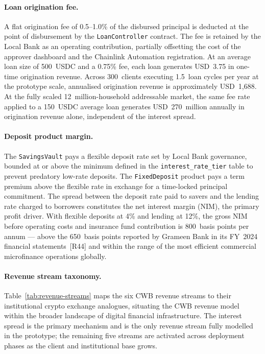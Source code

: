 \paragraph{Loan origination fee.}
A flat origination fee of 0.5--1.0\% of the disbursed principal is deducted
at the point of disbursement by the \texttt{LoanController} contract. The fee
is retained by the Local Bank as an operating contribution, partially
offsetting the cost of the approver dashboard and the Chainlink Automation
registration. At an average loan size of 500~USDC and a 0.75\% fee, each
loan generates USD~3.75 in one-time origination revenue. Across 300~clients
executing 1.5~loan cycles per year at the prototype scale, annualised
origination revenue is approximately USD~1{,}688. At the fully scaled
12~million-household addressable market, the same fee rate applied to a
150~USDC average loan generates USD~270~million annually in origination
revenue alone, independent of the interest spread.

\paragraph{Deposit product margin.}
The \texttt{SavingsVault} pays a flexible deposit rate set by Local Bank
governance, bounded at or above the minimum defined in the
\texttt{interest\_rate\_tier} table to prevent predatory low-rate deposits.
The \texttt{FixedDeposit} product pays a term premium above the flexible
rate in exchange for a time-locked principal commitment. The spread between
the deposit rate paid to savers and the lending rate charged to borrowers
constitutes the net interest margin (NIM), the primary profit driver. With
flexible deposits at 4\% and lending at 12\%, the gross NIM before operating
costs and insurance fund contribution is 800~basis points per annum --- above
the 650~basis points reported by Grameen Bank in its FY~2024 financial
statements~[R44] and within the range of the most efficient commercial
microfinance operations globally.


\paragraph{Revenue stream taxonomy.}
Table~\ref{tab:revenue-streams} maps the six CWB revenue streams to their
institutional crypto exchange analogues, situating the CWB revenue model
within the broader landscape of digital financial infrastructure. The interest
spread is the primary mechanism and is the only revenue stream fully modelled
in the prototype; the remaining five streams are activated across deployment
phases as the client and institutional base grows.

